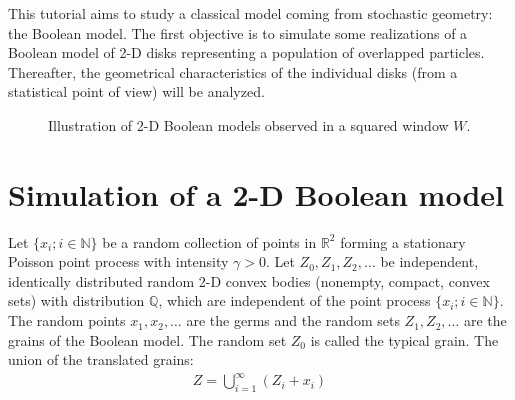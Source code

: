 \def\difficulty{3}


\vspace*{-15pt}

\begin{note}This tutorial aims to study a classical model coming from stochastic geometry: the Boolean model. The first objective is to simulate some realizations of a Boolean model of 2-D disks representing a population of overlapped particles. Thereafter, the geometrical characteristics of the individual disks (from a statistical point of view) will be analyzed.  
\end{note}

\vspace*{-10pt}

\begin{figure}[H]
\centering%
\caption{Illustration of 2-D Boolean models observed in a squared window $W$.}%
\hspace*{1.5cm}
%
\vspace*{-10pt}%
\label{fig:booleanModel}%
\end{figure}

\vspace*{-18pt}

\section{Simulation of a 2-D Boo\-lean model}
\vspace*{-10pt}
Let $\{x_i;i\in \mathbb{N}\}$ be a random collection of points in $\mathbb{R}^2$ forming a stationary Poisson point process with intensity $\gamma>0$. 
Let $Z_0,Z_1,Z_2,\dots$ be independent, identically distributed random 2-D convex bodies (nonempty, compact, convex sets) with distribution $\mathbb{Q}$, which are independent of the point process $\{x_i;i\in \mathbb{N}\}$. The random points $x_1,x_2,\dots$ are the germs and the random sets $Z_1,Z_2,\dots$ are the grains of the Boolean
model. The random set $Z_0$ is called the typical grain. The union of the translated grains:\vspace*{-8pt}
\begin{eqnarray}
Z=\bigcup_{i=1}^{\infty}(Z_i+x_i)
\end{eqnarray}
\vspace*{-12pt}

